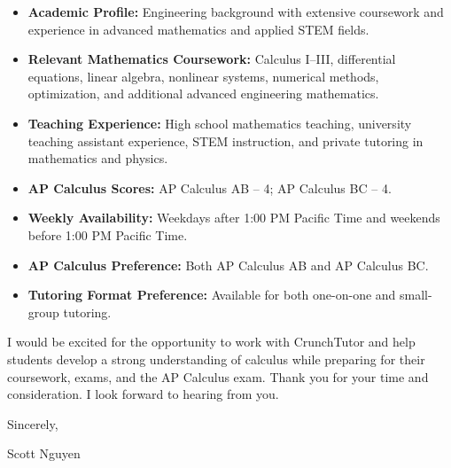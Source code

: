 \documentclass[11pt]{article}
\begin{document}
	\begin{itemize}
		\item \textbf{Academic Profile:} Engineering background with extensive coursework and experience in advanced mathematics and applied STEM fields.
		
		\item \textbf{Relevant Mathematics Coursework:} Calculus I--III, differential equations, linear algebra, nonlinear systems, numerical methods, optimization, and additional advanced engineering mathematics.
		
		\item \textbf{Teaching Experience:} High school mathematics teaching, university teaching assistant experience, STEM instruction, and private tutoring in mathematics and physics.
		
		\item \textbf{AP Calculus Scores:} AP Calculus AB -- 4; AP Calculus BC -- 4.
		
		\item \textbf{Weekly Availability:} Weekdays after 1:00 PM Pacific Time and weekends before 1:00 PM Pacific Time.
		
		\item \textbf{AP Calculus Preference:} Both AP Calculus AB and AP Calculus BC.
		
		\item \textbf{Tutoring Format Preference:} Available for both one-on-one and small-group tutoring.
	\end{itemize}
	
	I would be excited for the opportunity to work with CrunchTutor and help students develop a strong understanding of calculus while preparing for their coursework, exams, and the AP Calculus exam. Thank you for your time and consideration. I look forward to hearing from you.
	
	Sincerely,
	
	\vspace{0.2in}
	
	Scott Nguyen
	
\end{document}
